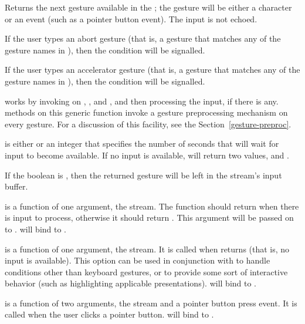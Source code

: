 Returns the next gesture available in the 
; the gesture will be either a character or an event (such as a
pointer button event).  The input is not echoed.

If the user types an abort gesture (that is, a gesture that matches any of the
gesture names in ), then the  condition
will be signalled.

If the user types an accelerator gesture (that is, a gesture that matches any of
the gesture names in ), then the 
condition will be signalled.

 works by invoking  on
, , and , and then processing the
input, if there is any.   methods on this generic function invoke a
gesture preprocessing mechanism on every gesture.  For a discussion of this
facility, see the Section~\ref{gesture-preproc}.

 is either  or an integer that specifies the number of
seconds that  will wait for input to become available.
If no input is available,  will return two values,
 and .

If the boolean  is , then the returned gesture will be
left in the stream's input buffer.

 is a function of one argument, the stream.  The function
should return  when there is input to process, otherwise it should
return .  This argument will be passed on to .
 will bind  to .

 is a function of one argument, the stream.  It is
called when  returns  (that is, no input is
available).  This option can be used in conjunction with 
to handle conditions other than keyboard gestures, or to provide some sort of
interactive behavior (such as highlighting applicable presentations).
 will bind  to
.

 is a function of two arguments, the stream
and a pointer button press event.  It is called when the user clicks a pointer
button.   will bind 
to .


